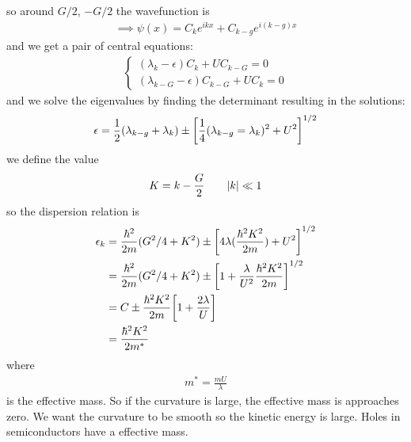 \documentclass[../main.tex]{subfiles}
\begin{document}
so around $G/2$, $-G/2$ the wavefunction is
\begin{align*}
    \implies \psi(x) = C_k e^{ikx} + C_{k-g} e^{i(k-g)x}
\end{align*}
and we get a pair of central equations:
\begin{align*}
    \begin{cases}
        (\lambda_k - \epsilon) C_k + U C_{k-G} = 0 \\
        (\lambda_{k-G} - \epsilon) C_{k-G} + U C_k = 0
    \end{cases}
\end{align*}
and we solve the eigenvalues by finding the determinant resulting in the solutions:
\begin{align*}
    \epsilon = \frac{1}{2} (\lambda_{k-g} + \lambda_k) \pm \qt[\frac{1}{4}(\lambda_{k-g} = \lambda_k)^2 + U^2]^{1/2}
\end{align*}
we define the value
\begin{align*}
    K = k - \frac{G}{2} \qquad \abs{k} \ll 1
\end{align*}
so the dispersion relation is
\begin{align*}
    \epsilon_{k} &= \frac{\hbar^2}{2m} (G^2/4 + K^2) \pm \qt[4\lambda(\frac{\hbar^2K^2}{2m}) + U^2]^{1/2} \\
    &= \frac{\hbar^2}{2m} (G^2/4 + K^2) \pm \qt[1 + \frac{\lambda}{U^2} \frac{\hbar^2K^2}{2m} ]^{1/2} \\
    &= C \pm \frac{\hbar^2K^2}{2m} \qt[1 + \frac{2\lambda}{U}] \\
    &= \frac{\hbar^2K^2}{2m^*}
\end{align*}
where 
\begin{align*}
    m^* = \frac{mU}{\lambda}
\end{align*}
is the effective mass. So if the curvature is large, the effective mass is approaches zero. We want
the curvature to be smooth so the kinetic energy is large. Holes in semiconductors have a effective
mass. 
\end{document}
